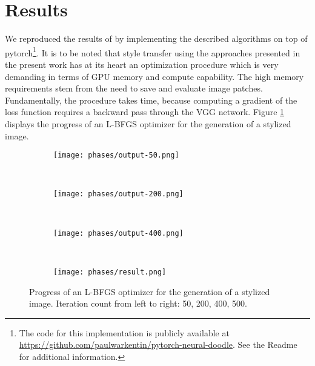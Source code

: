 
\section{Results}
\label{section:results}

We reproduced the results of \cite{doodles2016} by implementing the described algorithms on top of pytorch\footnote{The code for this implementation is publicly available at \url{https://github.com/paulwarkentin/pytorch-neural-doodle}. See the Readme for additional information.}. It is to be noted that style transfer using the approaches presented in the present work has at its heart an optimization procedure which is very demanding in terms of GPU memory and compute capability. The high memory requirements stem from the need to save and evaluate image patches. Fundamentally, the procedure takes time, because computing a gradient of the loss function requires a backward pass through the VGG network. Figure \ref{fig::phases} displays the progress of an L-BFGS optimizer for the generation of a stylized image.

\begin{figure}
	\begin{subfigure}[t]{0.23\textwidth}
		\centering
		\texttt{[image: phases/output-50.png]}
	\end{subfigure}%
	~
	\begin{subfigure}[t]{0.23\textwidth}
		\centering
		\texttt{[image: phases/output-200.png]}
	\end{subfigure}%
	~
	\begin{subfigure}[t]{0.23\textwidth}
		\centering
		\texttt{[image: phases/output-400.png]}
	\end{subfigure}
	~
	\begin{subfigure}[t]{0.23\textwidth}
		\centering
		\texttt{[image: phases/result.png]}
	\end{subfigure}
	
	\caption[]{Progress of an L-BFGS optimizer for the generation of a stylized image. Iteration count from left to right: 50, 200, 400, 500.}
	\label{fig::phases}
\end{figure}

